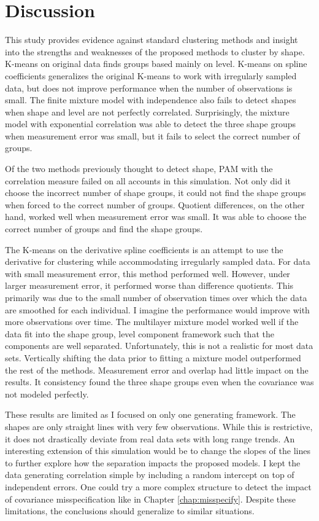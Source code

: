 \section{Discussion}
This study provides evidence against standard clustering methods and insight into the strengths and weaknesses of the proposed methods to cluster by shape. K-means on original data finds groups based mainly on level. K-means on spline coefficients generalizes the original K-means to work with irregularly sampled data, but does not improve performance when the number of observations is small. The finite mixture model with independence also fails to detect shapes when shape and level are not perfectly correlated. Surprisingly, the mixture model with exponential correlation was able to detect the three shape groups when measurement error was small, but it fails to select the correct number of groups.

Of the two methods previously thought to detect shape, PAM with the correlation measure failed on all accounts in this simulation. Not only did it choose the incorrect number of shape groups, it could not find the shape groups when forced to the correct number of groups. Quotient differences, on the other hand, worked well when measurement error was small. It was able to choose the correct number of groups and find the shape groups.

The K-means on the derivative spline coefficients is an attempt to use the derivative for clustering while accommodating irregularly sampled data. For data with small measurement error, this method performed well. However, under larger measurement error, it performed worse than difference quotients. This primarily was due to the small number of observation times over which the data are smoothed for each individual. I imagine the performance would improve with more observations over time.  The multilayer mixture model worked well if the data fit into the shape group, level component framework such that the components are well separated. Unfortunately, this is not a realistic for most data sets. Vertically shifting the data prior to fitting a mixture model outperformed the rest of the methods. Measurement error and overlap had little impact on the results. It consistency found the three shape groups even when the covariance was not modeled perfectly.

These results are limited as I focused on only one generating framework. The shapes are only straight lines with very few observations. While this is restrictive, it does not drastically deviate from real data sets with long range trends. An interesting extension of this simulation would be to change the slopes of the lines to further explore how the separation impacts the proposed models. I kept the data generating correlation simple by including a random intercept on top of independent errors. One could try a more complex structure to detect the impact of covariance misspecification like in Chapter \ref{chap:misspecify}. Despite these limitations, the conclusions should generalize to similar situations. 


